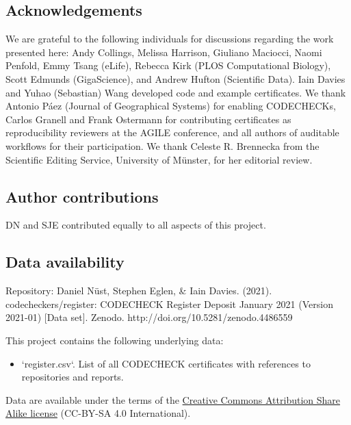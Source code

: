 \documentclass[12pt]{article}
\begin{document}
\subsection*{Acknowledgements}\label{acknowledgements}


We are grateful to the following individuals for discussions regarding
the work presented here: Andy Collings, Melissa Harrison, Giuliano
Maciocci, Naomi Penfold, Emmy Tsang (eLife), Rebecca Kirk (PLOS
Computational Biology), Scott Edmunds (GigaScience), and Andrew Hufton
(Scientific Data). Iain Davies and Yuhao (Sebastian) Wang developed
code and example certificates.  We thank Antonio P\'{a}ez (Journal of
Geographical Systems) for enabling CODECHECKs, Carlos Granell and
Frank Ostermann for contributing certificates as reproducibility
reviewers at the AGILE conference, and all authors of auditable
workflows for their participation.  We thank Celeste R. Brennecka from
the Scientific Editing Service, University of M\"unster, for her
editorial review.

\subsection*{Author contributions}

DN and SJE contributed equally to all aspects of this project.

\subsection{Data availability}

Repository: Daniel Nüst, Stephen Eglen, & Iain Davies. (2021). codecheckers/register: CODECHECK Register Deposit January 2021 (Version 2021-01) [Data set]. Zenodo. http://doi.org/10.5281/zenodo.4486559

This project contains the following underlying data:

\begin{itemize}
  \item `register.csv`. List of all CODECHECK certificates with references to repositories and reports.
\end{itemize}

Data are available under the terms of the \href{https://creativecommons.org/licenses/by-sa/4.0/legalcode}{Creative Commons Attribution Share Alike license} (CC-BY-SA 4.0 International).

{\small
}
\end{document}
